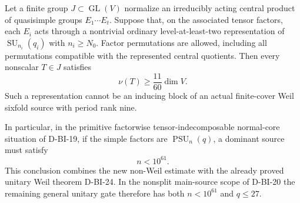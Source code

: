 \begin{theorem}
\label{D-UNW-03}
Let a finite group $J\subset\operatorname{GL}(V)$ normalize an
irreducibly acting central product of quasisimple groups
$E_1\cdots E_t$.  Suppose that, on the associated tensor factors,
each $E_i$ acts through a nontrivial ordinary level-at-least-two
representation of $\operatorname{SU}_{n_i}(q_i)$ with
$n_i\ge N_0$.  Factor permutations are allowed, including all
permutations compatible with the represented central quotients.
Then every nonscalar $T\in J$ satisfies
\[
                         \nu(T)\ge\frac{11}{60}\dim V.
                                                               \tag{UNW.12}
\]
Such a representation cannot be an inducing block of an actual
finite-cover Weil sixfold source with period rank nine.

In particular, in the primitive factorwise tensor-indecomposable
normal-core situation of D-BI-19, if the simple factors are
$\operatorname{PSU}_n(q)$, a dominant source must satisfy
\[
                              n<10^{61}.                    \tag{UNW.13}
\]
This conclusion combines the new non-Weil estimate with the
already proved unitary Weil theorem D-BI-24.  In the nonsplit
main-source scope of D-BI-20 the remaining general unitary gate
therefore has both $n<10^{61}$ and $q\le27$.
\end{theorem}

